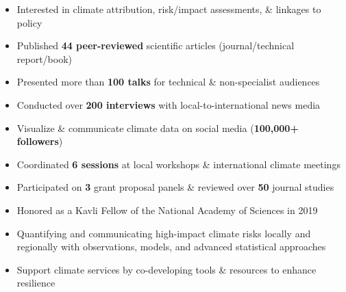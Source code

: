 \documentclass[10pt,letterpaper]{altacv} %
\begin{document}
\tagline{}

%

\begin{fullwidth}
\makecvheader
\end{fullwidth}

%

\vspace{-0.09in}
\begin{itemize}
    \setlength{\itemindent}{0.5em}
    \item[--] \small{Interested in climate attribution, risk\slash impact assessments, \& linkages to policy}
    \item[--] \small{Published \textbf{44 peer-reviewed} scientific articles (journal/technical report/book)}
    \item[--] \small{Presented more than \textbf{100 talks} for technical \& non-specialist audiences}
    \item[--] \small{Conducted over \textbf{200 interviews} with local-to-international news media}
    \item[--] \small{Visualize \& communicate climate data on social media (\textbf{100,000+ followers})}
    \item[--] \small{Coordinated \textbf{6 sessions} at local workshops \& international climate meetings}
    \item[--] \small{Participated on \textbf{3} grant proposal panels \& reviewed over \textbf{50} journal studies}    
    \item[--] \small{Honored as a Kavli Fellow of the National Academy of Sciences in 2019}
\end{itemize}
\smallskip

\vspace*{-0.2cm}

\begin{itemize}
\item[--] \small{Quantifying and communicating high-impact climate risks locally and regionally with observations, models, and advanced statistical approaches}
\item[--] \small{Support climate services by co-developing tools \& resources to enhance resilience}
\end{itemize}
\medskip
\end{document}
